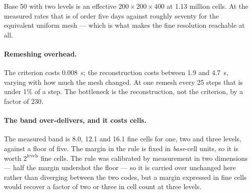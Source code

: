 Base 50 with two levels is an effective $200\times200\times400$ at 1.13 million
cells. At the measured rates that is of order five days against roughly seventy
for the equivalent uniform mesh --- which is what makes the fine resolution
reachable at all.

\paragraph{Remeshing overhead.} The criterion costs 0.008~s; the reconstruction
costs between 1.9 and 4.7~s, varying with how much the mesh changed. At one
remesh every 25 steps that is under 1\% of a step. The bottleneck is the
reconstruction, not the criterion, by a factor of 230.

\paragraph{The band over-delivers, and it costs cells.} The measured band is
8.0, 12.1 and 16.1 fine cells for one, two and three levels, against a floor of
five. The margin in the rule is fixed in \emph{base}-cell units, so it is worth
$2^{\text{levels}}$ fine cells. The rule was calibrated by measurement in two
dimensions --- half the margin undershot the floor --- so it is carried over
unchanged here rather than diverging between the two codes, but a margin
expressed in fine cells would recover a factor of two or three in cell count at
three levels.

